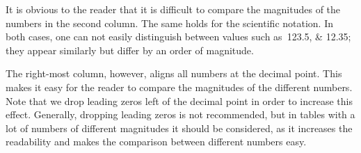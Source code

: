 It is obvious to the reader that it is difficult to compare the magnitudes of
the numbers in the second column.  The same holds for the scientific notation.
In both cases, one can not easily distinguish between values such
as~\numlist{123.5;12.35}; they appear similarly but differ by an order of
magnitude.

The right-most column, however, aligns all numbers at the decimal point.  This
makes it easy for the reader to compare the magnitudes of the different numbers.
Note that we drop leading zeros left of the decimal point in order to increase
this effect.  Generally, dropping leading zeros is not recommended, but in
tables with a lot of numbers of different magnitudes it should be considered, as
it increases the readability and makes the comparison between different numbers
easy.

